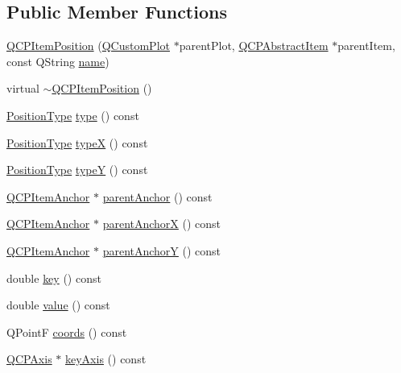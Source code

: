 \subsection*{Public Member Functions}
\begin{DoxyCompactItemize}
\item 
\hyperlink{classQCPItemPosition_a3efc524f37fdcd22907545eb77555ce4}{Q\+C\+P\+Item\+Position} (\hyperlink{classQCustomPlot}{Q\+Custom\+Plot} $\ast$parent\+Plot, \hyperlink{classQCPAbstractItem}{Q\+C\+P\+Abstract\+Item} $\ast$parent\+Item, const Q\+String \hyperlink{classQCPItemAnchor_ac93984042a58c875e76847dc3e5f75fe}{name})
\item 
virtual \hyperlink{classQCPItemPosition_ad8a289016f7a62332f9c865c39ab2047}{$\sim$\+Q\+C\+P\+Item\+Position} ()
\item 
\hyperlink{classQCPItemPosition_aad9936c22bf43e3d358552f6e86dbdc8}{Position\+Type} \hyperlink{classQCPItemPosition_aecb709d72c9aa334a7f62e2c9e0b5d60}{type} () const 
\item 
\hyperlink{classQCPItemPosition_aad9936c22bf43e3d358552f6e86dbdc8}{Position\+Type} \hyperlink{classQCPItemPosition_a3cb68cf9c95be05c66a0f47448e328e5}{typeX} () const 
\item 
\hyperlink{classQCPItemPosition_aad9936c22bf43e3d358552f6e86dbdc8}{Position\+Type} \hyperlink{classQCPItemPosition_a8a2fec9dec1ce006a598b32685fd7ab3}{typeY} () const 
\item 
\hyperlink{classQCPItemAnchor}{Q\+C\+P\+Item\+Anchor} $\ast$ \hyperlink{classQCPItemPosition_a7b4ffab9946945c0e11cd2352dc2e042}{parent\+Anchor} () const 
\item 
\hyperlink{classQCPItemAnchor}{Q\+C\+P\+Item\+Anchor} $\ast$ \hyperlink{classQCPItemPosition_a485abba71c8552086c5f68e95dca7f9a}{parent\+AnchorX} () const 
\item 
\hyperlink{classQCPItemAnchor}{Q\+C\+P\+Item\+Anchor} $\ast$ \hyperlink{classQCPItemPosition_a1502dba801cb20424b7e097399e372de}{parent\+AnchorY} () const 
\item 
double \hyperlink{classQCPItemPosition_ac3cb2bddf5f89e5181830be30b93d090}{key} () const 
\item 
double \hyperlink{classQCPItemPosition_a6817f7356d3a2b63e8446c6b6106dae1}{value} () const 
\item 
Q\+PointF \hyperlink{classQCPItemPosition_a253d7adbb6d46299bd6cbc31aa8819f1}{coords} () const 
\item 
\hyperlink{classQCPAxis}{Q\+C\+P\+Axis} $\ast$ \hyperlink{classQCPItemPosition_ab99de7ae5766d246defb2de9f47eaf51}{key\+Axis} () const 

\end{DoxyCompactItemize}
